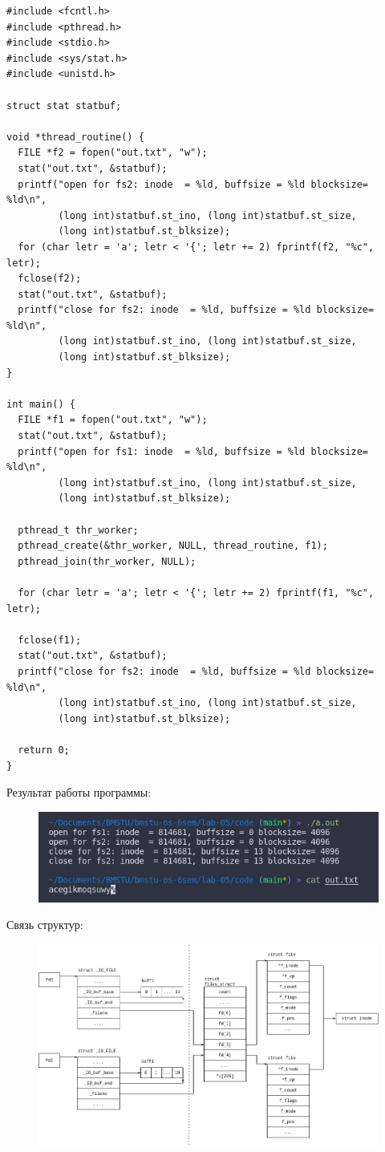 \begin{lstlisting}
#include <fcntl.h>
#include <pthread.h>
#include <stdio.h>
#include <sys/stat.h>
#include <unistd.h>

struct stat statbuf;

void *thread_routine() {
  FILE *f2 = fopen("out.txt", "w");
  stat("out.txt", &statbuf);
  printf("open for fs2: inode  = %ld, buffsize = %ld blocksize= %ld\n",
         (long int)statbuf.st_ino, (long int)statbuf.st_size,
         (long int)statbuf.st_blksize);
  for (char letr = 'a'; letr < '{'; letr += 2) fprintf(f2, "%c", letr);
  fclose(f2);
  stat("out.txt", &statbuf);
  printf("close for fs2: inode  = %ld, buffsize = %ld blocksize= %ld\n",
         (long int)statbuf.st_ino, (long int)statbuf.st_size,
         (long int)statbuf.st_blksize);
}

int main() {
  FILE *f1 = fopen("out.txt", "w");
  stat("out.txt", &statbuf);
  printf("open for fs1: inode  = %ld, buffsize = %ld blocksize= %ld\n",
         (long int)statbuf.st_ino, (long int)statbuf.st_size,
         (long int)statbuf.st_blksize);

  pthread_t thr_worker;
  pthread_create(&thr_worker, NULL, thread_routine, f1);
  pthread_join(thr_worker, NULL);

  for (char letr = 'a'; letr < '{'; letr += 2) fprintf(f1, "%c", letr);

  fclose(f1);
  stat("out.txt", &statbuf);
  printf("close for fs2: inode  = %ld, buffsize = %ld blocksize= %ld\n",
         (long int)statbuf.st_ino, (long int)statbuf.st_size,
         (long int)statbuf.st_blksize);

  return 0;
}
\end{lstlisting}
Результат работы программы:
\begin{figure}[H]
	\centering
	\includegraphics[scale=0.8]{assets/d_3_thread.png}
\end{figure}

Связь структур:
\begin{figure}[H]
	\centering
	\includegraphics[scale=0.45]{assets/d_3.png}
\end{figure}
